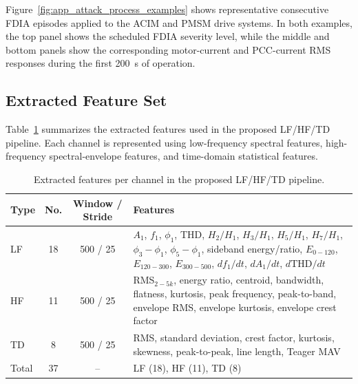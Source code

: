 \documentclass[lettersize,journal]{IEEEtran}
\begin{document}
Figure~\ref{fig:app_attack_process_examples} shows representative consecutive FDIA episodes applied to the ACIM and PMSM drive systems. In both examples, the top panel shows the scheduled FDIA severity level, while the middle and bottom panels show the corresponding motor-current and PCC-current RMS responses during the first 200~s of operation.





\subsection{Extracted Feature Set}
\label{app:feature_set}

Table~\ref{tab:app_extracted_features} summarizes the extracted features used in the proposed LF/HF/TD pipeline. Each channel is represented using low-frequency spectral features, high-frequency spectral-envelope features, and time-domain statistical features.

\begin{table}[t]
\centering
\scriptsize
\caption{Extracted features per channel in the proposed LF/HF/TD pipeline.}
\label{tab:app_extracted_features}
\setlength{\tabcolsep}{3pt}
\renewcommand{\arraystretch}{1.08}
\begin{tabularx}{\columnwidth}{l c c X}
\hline
Type & No. & Window / Stride & Features \\
\hline
LF & 18 & 500 / 25 &
$A_1$, $f_1$, $\phi_1$, THD, $H_2/H_1$, $H_3/H_1$, $H_5/H_1$, $H_7/H_1$,
$\phi_3-\phi_1$, $\phi_5-\phi_1$, sideband energy/ratio,
$E_{0-120}$, $E_{120-300}$, $E_{300-500}$,
$df_1/dt$, $dA_1/dt$, $d\mathrm{THD}/dt$ \\
\hline
HF & 11 & 500 / 25 &
RMS$_{2-5k}$, energy ratio, centroid, bandwidth, flatness, kurtosis,
peak frequency, peak-to-band, envelope RMS, envelope kurtosis, envelope crest factor \\
\hline
TD & 8 & 500 / 25 &
RMS, standard deviation, crest factor, kurtosis, skewness, peak-to-peak, line length, Teager MAV \\
\hline
Total & 37 & -- & LF (18), HF (11), TD (8) \\
\hline
\end{tabularx}
\end{table}
\end{document}

